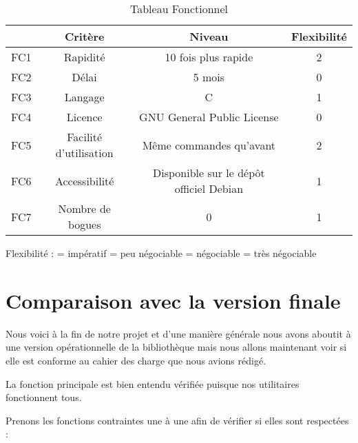 \begin{table}[h]
\begin{center}
\begin{tabular}{|c|c|c|c|}
\hline
 & Crit\`ere & Niveau & Flexibilit\'e \\
\hline
 FC1 & Rapidit\'e & 10 fois plus rapide & 2 \\
\hline
 FC2 & D\'elai & 5 mois & 0 \\
\hline
 FC3 & Langage & C & 1 \\
\hline
 FC4 & Licence & GNU General Public License & 0 \\
\hline
 FC5 & Facilit\'e d'utilisation & M\^eme commandes qu'avant & 2 \\
\hline
 FC6 & Accessibilit\'e & Disponible sur le d\'ep\^ot officiel Debian & 1 \\
\hline
 FC7 & Nombre de bogues & 0 & 1 \\
\hline
\end{tabular}
\caption{Tableau Fonctionnel}
\end{center}
\label{tab:tabfonctionnel}
\end{table}

Flexibilit\'e :  = imp\'eratif = peu n\'egociable = n\'egociable = tr\`es n\'egociable\newline

\section{Comparaison avec la version finale}
Nous voici \`a la fin de notre projet et d'une mani\`ere g\'en\'erale nous avons aboutit \`a une version op\'erationnelle de la biblioth\`eque mais nous 
allons maintenant voir si elle est conforme au cahier des charge que nous avions r\'edig\'e.

La fonction principale est bien entendu v\'erifi\'ee puisque nos utilitaires fonctionnent tous.

Prenons les fonctions contraintes une \`a une afin de v\'erifier si elles sont respect\'ees :

